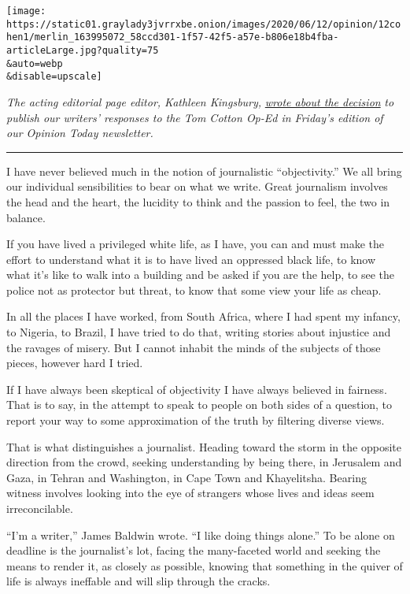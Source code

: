 \texttt{[image: https://static01.graylady3jvrrxbe.onion/images/2020/06/12/opinion/12cohen1/merlin\_163995072\_58ccd301-1f57-42f5-a57e-b806e18b4fba-articleLarge.jpg?quality=75\\\&auto=webp\\\&disable=upscale]}

\emph{The acting editorial page editor, Kathleen Kingsbury,}
\href{https://www.nytimes3xbfgragh.onion/2020/06/12/opinion/tom-cotton-new-york-times.html}{\emph{wrote
about the decision}} \emph{to publish our writers' responses to the Tom
Cotton Op-Ed in Friday's edition of our Opinion Today newsletter.}

\begin{center}\rule{0.5\linewidth}{\linethickness}\end{center}

I have never believed much in the notion of journalistic
``objectivity.'' We all bring our individual sensibilities to bear on
what we write. Great journalism involves the head and the heart, the
lucidity to think and the passion to feel, the two in balance.

If you have lived a privileged white life, as I have, you can and must
make the effort to understand what it is to have lived an oppressed
black life, to know what it's like to walk into a building and be asked
if you are the help, to see the police not as protector but threat, to
know that some view your life as cheap.

In all the places I have worked, from South Africa, where I had spent my
infancy, to Nigeria, to Brazil, I have tried to do that, writing stories
about injustice and the ravages of misery. But I cannot inhabit the
minds of the subjects of those pieces, however hard I tried.

If I have always been skeptical of objectivity I have always believed in
fairness. That is to say, in the attempt to speak to people on both
sides of a question, to report your way to some approximation of the
truth by filtering diverse views.

That is what distinguishes a journalist. Heading toward the storm in the
opposite direction from the crowd, seeking understanding by being there,
in Jerusalem and Gaza, in Tehran and Washington, in Cape Town and
Khayelitsha. Bearing witness involves looking into the eye of strangers
whose lives and ideas seem irreconcilable.

``I'm a writer,'' James Baldwin wrote. ``I like doing things alone.'' To
be alone on deadline is the journalist's lot, facing the many-faceted
world and seeking the means to render it, as closely as possible,
knowing that something in the quiver of life is always ineffable and
will slip through the cracks.

